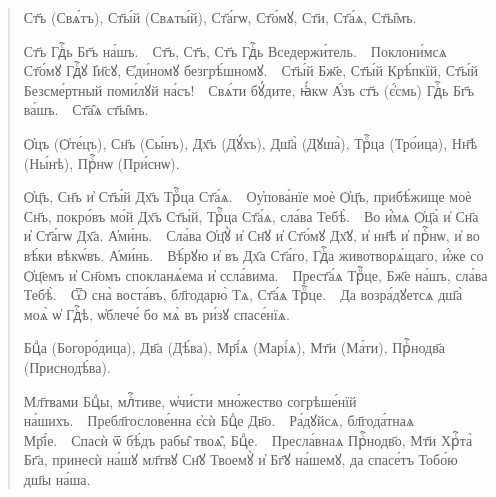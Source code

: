 \documentclass[11pt,a4paper,oneside]{memoir}
\newcommand{\exercise}{}
\begin{document}
    \begin{quote}\begin{slv}
        Ст҃ъ (Свѧ́тъ), Ст҃ы́й (Свѧты́й), Ст҃а́гѡ, Ст҃о́мꙋ, Ст҃и, Ст҃а́ѧ, Ст҃ы̑мъ.
        
        Ст҃ъ Гдⷭ҇ь Бг҃ъ на́шъ.~\textemdash~Ст҃ъ, Ст҃ъ, Ст҃ъ Гдⷭ҇ь Вседержи́тель.~\textemdash~Поклони́мсѧ Ст҃о́мꙋ Гдⷭ҇ꙋ І҆и҃сꙋ, Є҆ди́номꙋ безгрѣ́шномꙋ.~\textemdash~Ст҃ы́й Бж҃е, Ст҃ы́й Крѣ́пкїй, Ст҃ы́й Безсме́ртный поми́лꙋй на́съ!~\textemdash~Свѧ́ти бꙋ́дите, ꙗ҆́кѡ А҆́зъ ст҃ъ (є҆́смь) Гдⷭ҇ь Бг҃ъ ва́шъ.~\textemdash~Ст҃а̑ѧ ст҃ы̑мъ.
        
        Ѻ҆цъ (Ѻ҆те́цъ), Сн҃ъ (Сы́нъ), Дх҃ъ (Дꙋ́хъ), Дш҃а̀ (Дꙋша̀), Трⷪ҇ца (Тро́ица), Нн҃ѣ (Ны́нѣ), Прⷭ҇нѡ (При́снѡ).
        
        Ѻ҆ц҃ъ, Сн҃ъ и҆ Ст҃ы́й Дх҃ъ Трⷪ҇ца Ст҃а́ѧ.~\textemdash~Оу҆пова́нїе моѐ Ѻ҆ц҃ъ, прибѣ́жище моѐ Сн҃ъ, покро́въ мо́й Дх҃ъ Ст҃ы́й, Трⷪ҇ца Ст҃а́ѧ, сла́ва Тебѣ̀.~\textemdash~Во и҆́мѧ Ѻ҆ц҃а̀ и҆ Сн҃а и҆ Ст҃а́гѡ Дх҃а. А҆ми́нь.~\textemdash~Сла́ва Ѻ҆ц҃ꙋ̀ и҆ Сн҃ꙋ и҆ Ст҃о́мꙋ Дх҃ꙋ, и҆ нн҃ѣ и҆ прⷭ҇нѡ, и҆ во вѣ́ки вѣкѡ́въ. А҆ми́нь.~\textemdash~Вѣ́рꙋю и҆ въ Дх҃а Ст҃а́го, Гдⷭ҇а животворѧ́щаго, и҆́же со Ѻ҆ц҃емъ и҆ Сн҃омъ спокланѧ́ема и҆ ссла́вима.~\textemdash~Прест҃а́ѧ Трⷪ҇це, Бж҃е на́шъ, сла́ва Тебѣ̀.~\textemdash~Ѿ сна̀ воста́въ, бл҃годарю̀ Тѧ, Ст҃а́ѧ Трⷪ҇це.~\textemdash~Да возра́дꙋетсѧ дш҃а̀ моѧ̀ ѡ҆ Гдⷭ҇ѣ, ѡ҆блече́ бо мѧ̀ въ ри́зꙋ спасе́нїѧ.
        
        Бцⷣа (Богоро́дица), Дв҃а (Дѣ́ва), Мр҃і́ѧ (Марі́ѧ), Мт҃и (Ма́ти), Прⷭ҇нодв҃а (Приснодѣ́ва).
        
        Мл҃твами Бцⷣы, млⷭ҇тиве, ѡ҆чи́сти мно́жество согрѣше́нїй на́шихъ.~\textemdash~Пребл҃гослове́нна є҆сѝ Бцⷣе Дв҃о.~\textemdash~Ра́дꙋйсѧ, бл҃года́тнаѧ Мр҃і́е.~\textemdash~Спасѝ ѿ бѣ́дъ рабы̑ твоѧ̑, Бцⷣе.~\textemdash~Пресла́внаѧ Прⷭ҇нодв҃о, Мт҃и Хрⷭ҇та̀ Бг҃а, принесѝ на́шꙋ мл҃твꙋ Сн҃ꙋ Твоемꙋ̀ и҆ Бг҃ꙋ на́шемꙋ, да спасе́тъ Тобо́ю дш҃ы на́ша.
    \end{slv}\end{quote}
    \medskip

                    \paragraph{\exercise}
\end{document}
